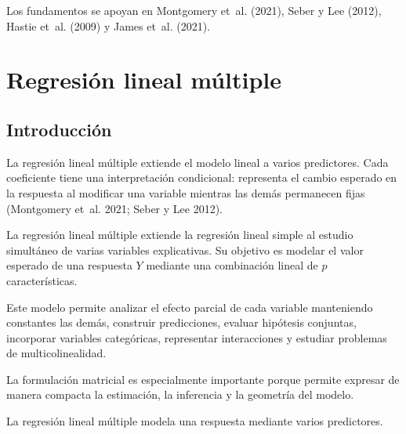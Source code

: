 \documentclass[
  spanish,
  10.5pt,
  letterpaper,
  DIV=11,
  numbers=noendperiod,
  oneside,
  open=any]{scrreprt}
\theoremstyle{definition}
\theoremstyle{definition}
\theoremstyle{plain}
\theoremstyle{remark}
\begin{document}
Los fundamentos se apoyan en Montgomery et~al. (2021), Seber y Lee
(2012), Hastie et~al. (2009) y James et~al. (2021).

\chapter{\texorpdfstring{Regresión lineal
múltiple}{Regresión lineal múltiple}}\label{sec-regresion-lineal-multiple}

\section*{Introducción}\label{introducciuxf3n-10}


La regresión lineal múltiple extiende el modelo lineal a varios
predictores. Cada coeficiente tiene una interpretación condicional:
representa el cambio esperado en la respuesta al modificar una variable
mientras las demás permanecen fijas (Montgomery et~al. 2021; Seber y Lee
2012).

La regresión lineal múltiple extiende la regresión lineal simple al
estudio simultáneo de varias variables explicativas. Su objetivo es
modelar el valor esperado de una respuesta \(Y\) mediante una
combinación lineal de \(p\) características.

Este modelo permite analizar el efecto parcial de cada variable
manteniendo constantes las demás, construir predicciones, evaluar
hipótesis conjuntas, incorporar variables categóricas, representar
interacciones y estudiar problemas de
multicolinealidad.

La formulación matricial es especialmente importante porque permite
expresar de manera compacta la estimación, la inferencia y la geometría
del modelo.

\begin{tcolorbox}[enhanced jigsaw, arc=.35mm, bottomrule=.15mm, bottomtitle=1mm, breakable, colback=white, colbacktitle=quarto-callout-important-color!10!white, colframe=quarto-callout-important-color-frame, coltitle=black, left=2mm, leftrule=.75mm, opacityback=0, opacitybacktitle=0.6, rightrule=.15mm, title=\textcolor{quarto-callout-important-color}{\faExclamation}\hspace{0.5em}{Definición esencial}, titlerule=0mm, toprule=.15mm, toptitle=1mm]

La regresión lineal múltiple modela una respuesta mediante varios
predictores.

\end{tcolorbox}
\end{document}
